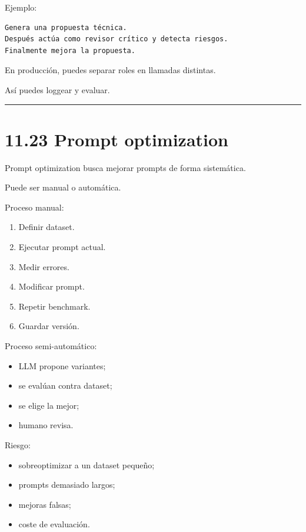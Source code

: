 Ejemplo:

\begin{lstlisting}
Genera una propuesta técnica.
Después actúa como revisor crítico y detecta riesgos.
Finalmente mejora la propuesta.
\end{lstlisting}

En producción, puedes separar roles en llamadas distintas.

Así puedes loggear y evaluar.

\begin{center}\rule{0.5\linewidth}{0.5pt}\end{center}

\section{11.23 Prompt optimization}\label{prompt-optimization}

Prompt optimization busca mejorar prompts de forma sistemática.

Puede ser manual o automática.

Proceso manual:

\begin{enumerate}
\def\labelenumi{\arabic{enumi}.}
\tightlist
\item
  Definir dataset.
\item
  Ejecutar prompt actual.
\item
  Medir errores.
\item
  Modificar prompt.
\item
  Repetir benchmark.
\item
  Guardar versión.
\end{enumerate}

Proceso semi-automático:

\begin{itemize}
\tightlist
\item
  LLM propone variantes;
\item
  se evalúan contra dataset;
\item
  se elige la mejor;
\item
  humano revisa.
\end{itemize}

Riesgo:

\begin{itemize}
\tightlist
\item
  sobreoptimizar a un dataset pequeño;
\item
  prompts demasiado largos;
\item
  mejoras falsas;
\item
  coste de evaluación.
\end{itemize}

